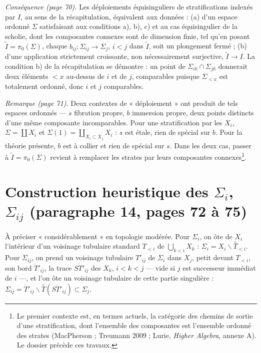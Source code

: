 \documentclass[11pt,a4paper]{article}
\begin{document}
\emph{Conséquence (page 70).} Les déploiements équisinguliers de stratifications
indexés par $I$, au sens de la récapitulation, équivalent aux données : (a) d'un
espace ordonné $\Sigma$ satisfaisant aux conditions a), b), c) et au cas
équisingulier de la scholie, dont les composantes connexes sont de dimension finie,
tel qu'en posant $\tilde I = \pi_0(\Sigma)$, chaque $b_{ij} : \Sigma_{ij} \to
\Sigma_j$, $i<j$ dans $\tilde I$, soit un plongement fermé ; (b) d'une application
strictement croissante, non nécessairement surjective, $\tilde I \to I$. La condition
b) de la récapitulation se démontre : un point de $\Sigma_{ik} \cap \Sigma_{jk}$
donnerait deux éléments $< x$ au-dessus de $i$ et de $j$, comparables puisque
$\Sigma_{<x}$ est totalement ordonné, donc $i$ et $j$ comparables.

\emph{Remarque (page 71).} Deux contextes de « déploiement » ont produit de tels
espaces ordonnés — $s$ fibration propre, $b$ immersion propre, deux points distincts
d'une même composante incomparables. Pour une stratification par les $X_i$, $\Sigma =
\coprod X_i$ et $\Sigma(1) = \coprod_{X_i \subset X_j} X_i$ : $s$ est étale, rien de
spécial sur $b$. Pour la théorie présente, $b$ est à collier et rien de spécial sur
$s$. Dans les deux cas, passer à $\tilde I = \pi_0(\Sigma)$ revient à remplacer les
strates par leurs composantes connexes\footnote{Le premier contexte est, en termes
actuels, la catégorie des chemins de sortie d'une stratification, dont l'ensemble
des composantes est l'ensemble ordonné des strates (MacPherson ; Treumann 2009 ;
Lurie, \emph{Higher Algebra}, annexe A). Le dossier précède ces travaux.}.

\section*{Construction heuristique des $\Sigma_i$, $\Sigma_{ij}$ (paragraphe 14, pages 72 à 75)}

À préciser « considérablement » en topologie modérée. Pour $\Sigma_i$, on ôte de
$X_i$ l'intérieur d'un voisinage tubulaire standard $T_{<i}$ de $\bigcup_{k<i} X_k$ :
$\Sigma_i = X_i \smallsetminus \overset{\circ}{T}_{<i}$. Pour $\Sigma_{ij}$, on prend un
voisinage tubulaire $T'_{ij}$ de $\Sigma_i$ dans $X_j$, petit devant $T_{<i}$, son bord
$\dot T'_{ij}$, la trace $S \dot T'_{ij}$ des $X_k$, $i<k<j$ — vide si $j$ est
successeur immédiat de $i$ —, et l'on ôte un voisinage tubulaire de cette partie
singulière : $\Sigma_{ij} = \dot T'_{ij} \smallsetminus \overset{\circ}{T}(S \dot
T'_{ij}) \subset \Sigma_j$.
\end{document}
